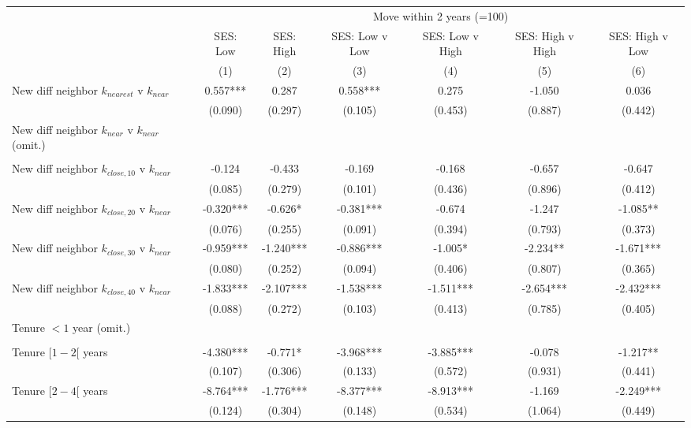 \begin{tabular}{lcccccc}
\toprule
 & \multicolumn{6}{c}{Move within 2 years (=100)} \\ 
\cmidrule(lr){2-7}
 & SES: Low & SES: High & SES: Low v Low & SES: Low v High & SES: High v High & SES: High v Low \\ 
\cmidrule(lr){2-2} \cmidrule(lr){3-3} \cmidrule(lr){4-4} \cmidrule(lr){5-5} \cmidrule(lr){6-6} \cmidrule(lr){7-7}
  & (1) & (2) & (3) & (4) & (5) & (6) \\ 
\midrule
New diff neighbor $k_{nearest}$ v $k_{near}$ & 0.557*** & 0.287 & 0.558*** & 0.275 & -1.050 & 0.036 \\ 
 & (0.090) & (0.297) & (0.105) & (0.453) & (0.887) & (0.442) \\ 
New diff neighbor $k_{near}$ v $k_{near}$ (omit.) & & & & & & \\ 
 &   &   &   &   &   &   \\ 
New diff neighbor $k_{close,10}$ v $k_{near}$ & -0.124 & -0.433 & -0.169 & -0.168 & -0.657 & -0.647 \\ 
 & (0.085) & (0.279) & (0.101) & (0.436) & (0.896) & (0.412) \\ 
New diff neighbor $k_{close,20}$ v $k_{near}$ & -0.320*** & -0.626* & -0.381*** & -0.674 & -1.247 & -1.085** \\ 
 & (0.076) & (0.255) & (0.091) & (0.394) & (0.793) & (0.373) \\ 
New diff neighbor $k_{close,30}$ v $k_{near}$ & -0.959*** & -1.240*** & -0.886*** & -1.005* & -2.234** & -1.671*** \\ 
 & (0.080) & (0.252) & (0.094) & (0.406) & (0.807) & (0.365) \\ 
New diff neighbor $k_{close,40}$ v $k_{near}$ & -1.833*** & -2.107*** & -1.538*** & -1.511*** & -2.654*** & -2.432*** \\ 
 & (0.088) & (0.272) & (0.103) & (0.413) & (0.785) & (0.405) \\ 
 Tenure $<1$ year (omit.) &  & &  &  & &  \\ 
 & &  &  &  &  &  \\ 
 Tenure $[1-2[$ years & -4.380*** & -0.771* & -3.968*** & -3.885*** & -0.078 & -1.217** \\ 
 & (0.107) & (0.306) & (0.133) & (0.572) & (0.931) & (0.441) \\ 
Tenure $[2-4[$ years & -8.764*** & -1.776*** & -8.377*** & -8.913*** & -1.169 & -2.249*** \\ 
 & (0.124) & (0.304) & (0.148) & (0.534) & (1.064) & (0.449) \\ 

\end{tabular}
